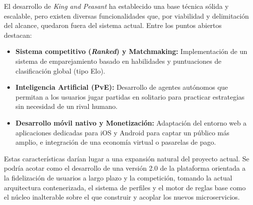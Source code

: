 El desarrollo de \textit{King and Peasant} ha establecido una base técnica sólida y escalable, pero existen diversas funcionalidades que, por viabilidad y delimitación del alcance, quedaron fuera del sistema actual. Entre los puntos abiertos destacan:

\begin{itemize}
    \item \textbf{Sistema competitivo (\textit{Ranked}) y Matchmaking:} Implementación de un sistema de emparejamiento basado en habilidades y puntuaciones de clasificación global (tipo Elo).
    \item \textbf{Inteligencia Artificial (PvE):} Desarrollo de agentes autónomos que permitan a los usuarios jugar partidas en solitario para practicar estrategias sin necesidad de un rival humano.
    \item \textbf{Desarrollo móvil nativo y Monetización:} Adaptación del entorno web a aplicaciones dedicadas para iOS y Android para captar un público más amplio, e integración de una economía virtual o pasarelas de pago.
\end{itemize}

Estas características darían lugar a una expansión natural del proyecto actual. Se podría acotar como el desarrollo de una versión 2.0 de la plataforma orientada a la fidelización de usuarios a largo plazo y la competición, tomando la actual arquitectura contenerizada, el sistema de perfiles y el motor de reglas base como el núcleo inalterable sobre el que construir y acoplar los nuevos microservicios.
